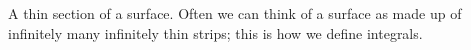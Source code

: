 A thin section of a surface. Often we can think of a surface
as made up of infinitely many infinitely thin strips; this
is how we define integrals.